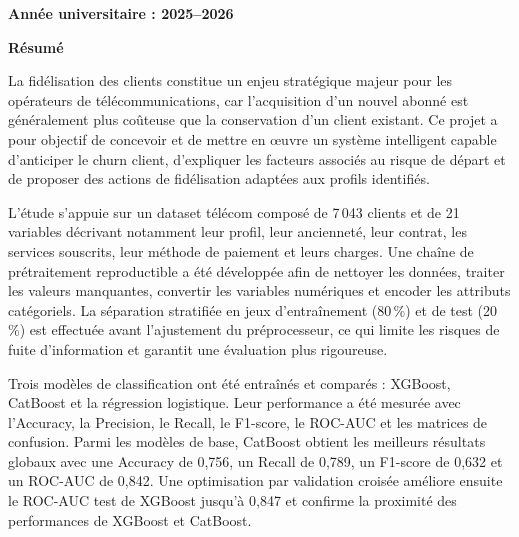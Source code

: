 \documentclass[12pt, a4paper]{article}
\newcommand{\AnneeUniversitaire}{2025--2026}
\begin{document}
\begin{titlepage}
    \vfill
    {\large\bfseries Année universitaire : \AnneeUniversitaire\par}
    \vspace{0.35cm}

    \restoregeometry
\end{titlepage}

\newpage
\thispagestyle{plain}
\begin{center}
    {\LARGE\bfseries\color{mlblue}Résumé\par}
\end{center}
\vspace{0.8cm}

La fidélisation des clients constitue un enjeu stratégique majeur pour les
opérateurs de télécommunications, car l'acquisition d'un nouvel abonné est
généralement plus coûteuse que la conservation d'un client existant. Ce projet
a pour objectif de concevoir et de mettre en œuvre un système intelligent
capable d'anticiper le churn client, d'expliquer les facteurs associés au risque
de départ et de proposer des actions de fidélisation adaptées aux profils
identifiés.

L'étude s'appuie sur un dataset télécom composé de 7\,043 clients et de 21
variables décrivant notamment leur profil, leur ancienneté, leur contrat, les
services souscrits, leur méthode de paiement et leurs charges. Une chaîne de
prétraitement reproductible a été développée afin de nettoyer les données,
traiter les valeurs manquantes, convertir les variables numériques et encoder
les attributs catégoriels. La séparation stratifiée en jeux d'entraînement
(80\,\%) et de test (20\,\%) est effectuée avant l'ajustement du préprocesseur,
ce qui limite les risques de fuite d'information et garantit une évaluation
plus rigoureuse.

Trois modèles de classification ont été entraînés et comparés : XGBoost,
CatBoost et la régression logistique. Leur performance a été mesurée avec
l'Accuracy, la Precision, le Recall, le F1-score, le ROC-AUC et les matrices de
confusion. Parmi les modèles de base, CatBoost obtient les meilleurs résultats
globaux avec une Accuracy de 0,756, un Recall de 0,789, un F1-score de 0,632 et
un ROC-AUC de 0,842. Une optimisation par validation croisée améliore ensuite
le ROC-AUC test de XGBoost jusqu'à 0,847 et confirme la proximité des
performances de XGBoost et CatBoost.
\end{document}
